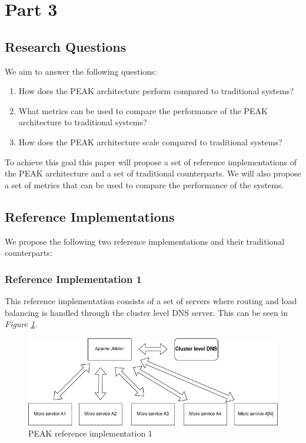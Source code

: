\documentclass[12pt]{article}
\begin{document}
\section{Part 3}
\subsection{Research Questions}
We aim to answer the following questions:
\begin{enumerate}
    \item How does the PEAK architecture perform compared to traditional systems?
    \item What metrics can be used to compare the performance of the PEAK architecture to traditional systems?
    \item How does the PEAK architecture scale compared to traditional systems?
\end{enumerate}
To achieve this goal this paper will propose a set of reference implementations of the PEAK architecture and a set of traditional counterparts.
We will also propose a set of metrics that can be used to compare the performance of the systems.

\subsection{Reference Implementations}
We propose the following two reference implementations and their traditional counterparts:

\subsubsection{Reference Implementation 1}
This reference implementation consists of a set of servers where routing and load balancing is handled through the cluster level DNS server.
This can be seen in \textit{Figure \ref{fig:test-one}}.

\begin{figure}[H]
    \centering
    \includegraphics[width=\textwidth]{test-one.drawio.png}
    \caption{PEAK reference implementation 1}
    \label{fig:test-one}
\end{figure}
\end{document}
